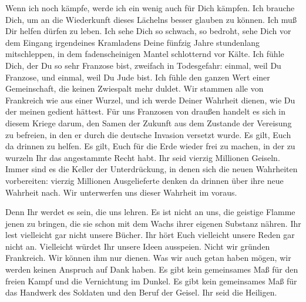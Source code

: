 \documentclass[12pt,ngerman,draft]{scrartcl}
\begin{document}
Wenn ich noch kämpfe, werde ich ein wenig auch für Dich kämpfen. Ich brauche Dich, um an die Wiederkunft dieses Lächelns besser glauben zu können. Ich muß Dir helfen dürfen zu leben. Ich sehe Dich so schwach, so bedroht, sehe Dich vor dem Eingang irgendeines Kramladens Deine fünfzig Jahre stundenlang mitschleppen, in dem fadenscheinigen Mantel schlotternd vor Kälte. Ich fühle Dich, der Du so sehr Franzose bist, zweifach in Todesgefahr: einmal, weil Du Franzose, und einmal, weil Du Jude bist. Ich fühle den ganzen Wert einer Gemeinschaft, die keinen Zwiespalt mehr duldet. Wir stammen alle von Frankreich wie aus einer Wurzel, und ich werde Deiner Wahrheit dienen, wie Du der meinen gedient hättest. Für uns Franzosen von draußen handelt es sich in diesem Kriege darum, den Samen der Zukunft aus dem Zustande der Vereisung zu befreien, in den er durch die deutsche Invasion versetzt wurde. Es gilt, Euch da drinnen zu helfen. Es gilt, Euch für die Erde wieder frei zu machen, in der zu wurzeln Ihr das angestammte Recht habt. Ihr seid vierzig Millionen Geiseln. Immer sind es die Keller der Unterdrückung, in denen sich die neuen Wahrheiten vorbereiten: vierzig Millionen Ausgelieferte denken da drinnen über ihre neue Wahrheit nach. Wir unterwerfen uns dieser Wahrheit im voraus.

Denn Ihr werdet es sein, die uns lehren. Es ist nicht an uns, die geistige Flamme jenen zu bringen, die sie schon mit dem Wachs ihrer eigenen Substanz nähren. Ihr lest vielleicht gar nicht unsere Bücher. Ihr hört Euch vielleicht unsere Reden gar nicht an. Vielleicht würdet Ihr unsere Ideen ausspeien. Nicht wir gründen Frankreich. Wir können ihm nur dienen. Was wir auch getan haben mögen, wir werden keinen Anspruch auf Dank haben. Es gibt kein gemeinsames Maß für den freien Kampf und die Vernichtung im Dunkel. Es gibt kein gemeinsames Maß für das Handwerk des Soldaten und den Beruf der Geisel. Ihr seid die Heiligen.
\end{document}
